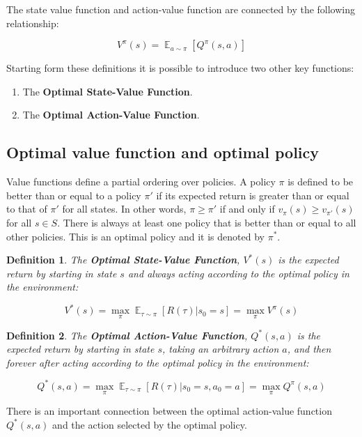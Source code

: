 \documentclass{article}
\newtheorem{definition}{Definition}
\DeclareMathOperator*{\E}{\mathbb{E}}
\begin{document}
The state value function and action-value function are connected by the following relationship:

\begin{equation}
V^\pi(s) = \E_{a \sim \pi}[Q^\pi (s,a)]
\end{equation}

Starting form these definitions it is possible to introduce two other key functions:

\begin{enumerate}
	\item The \textbf{Optimal State-Value Function}.
	\item The \textbf{Optimal Action-Value Function}.
\end{enumerate}

\subsection{Optimal value function and optimal policy }
Value functions define a partial ordering over policies. A policy $\pi$ is defined to be better than or equal to a policy $\pi'$ if its expected return is greater than or equal to that of $\pi'$ for all states. In other words, $\pi \geq \pi'$ if and only if $v_\pi(s) \geq v_{\pi'}(s)$ for all $s \in S$. There is always at least one policy that is better than or equal to all other policies. This is an optimal policy and it is denoted by $\pi^*$.

\begin{definition}
	The \textbf{Optimal State-Value Function}, $V^*(s)$ is the expected return by starting in state $s$ and always acting according to the \textit{optimal} policy in the environment:
	
	\begin{equation}
		V^{*}(s) = \max_\pi \E_{\tau \sim \pi} [R(\tau)| s_0 = s] = \max_\pi V^\pi(s)
	\end{equation}
\end{definition}

\begin{definition}
	The \textbf{Optimal Action-Value Function}, $Q^*(s,a)$ is the expected return by starting in state $s$, taking an arbitrary action $a$, and then forever after acting according to the \textit{optimal} policy in the environment:
	
	\begin{equation}
	Q^*(s,a) = \max_{\pi} \E_{\tau \sim \pi}{[R(\tau)| s_0 = s, a_0 = a]} = \max_\pi Q^\pi(s,a)
	\end{equation}
	
\end{definition}
There is an important connection between the optimal action-value function $Q^*(s,a)$ and the action selected by the optimal policy.
\end{document}
